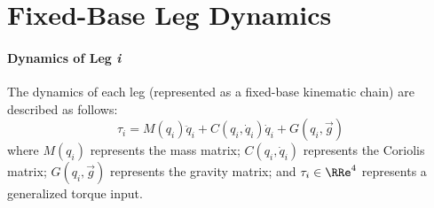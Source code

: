 \vspace{-10mm}
\chapter{Fixed-Base Leg Dynamics}
\label{appendix::b}
	\vspace{-5mm}


	\subsubsection{Dynamics of Leg \emph{i}}

	The dynamics of each \Ith leg (represented as a fixed-base kinematic chain) are described as follows:	
		\begin{equation*}
			\tau_{i} = M(q_{i})\ddot{q}_{i} + C(q_{i},\dot{q}_{i})\dot{q}_{i} + G(q_{i},\vec{g})
		\end{equation*}
	where $M(q_{i})$ represents the mass matrix; $C(q_{i},\dot{q}_{i})$ represents the Coriolis matrix; $G(q_{i},\vec{g})$ represents the gravity matrix; and $\tau_{i}\in\RRe^{4}$ represents a generalized torque input. %

